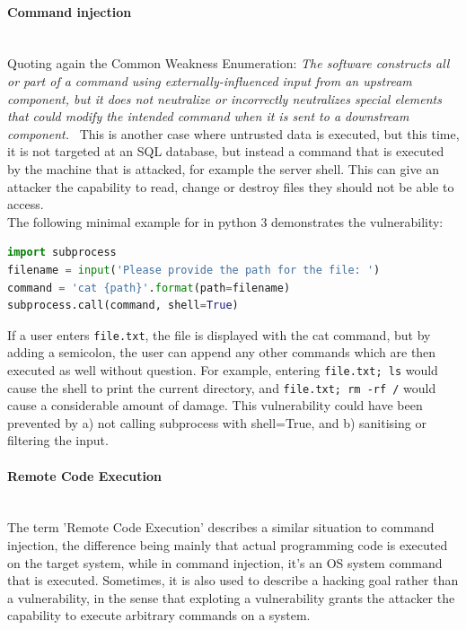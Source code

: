 \documentclass[
	a4paper,
	pagesize,
	pdftex,
	12pt,
	twoside, %
	BCOR=5mm, %
	ngerman,
	fleqn,
	final,
	]{scrartcl}
\begin{document}
\paragraph{Command injection}\mbox{}\\
Quoting again the Common Weakness Enumeration: \textit{The software constructs all or part of a command using externally-influenced input from an upstream component, but it does not neutralize or incorrectly neutralizes special elements that could modify the intended command when it is sent to a downstream component.}~\cite{CommonWeaknessEnumeration.23.9.2019} This is another case where untrusted data is executed, but this time, it is not targeted at an SQL database, but instead a command that is executed by the machine that is attacked, for example the server shell. This can give an attacker the capability to read, change or destroy files they should not be able to access. \\
The following minimal example for in python 3 demonstrates the vulnerability:
\begin{lstlisting}[language=Python,showstringspaces=false]
import subprocess
filename = input('Please provide the path for the file: ')
command = 'cat {path}'.format(path=filename)
subprocess.call(command, shell=True)
\end{lstlisting}
If a user enters \texttt{file.txt}, the file is displayed with the cat command, but by adding a semicolon, the user can append any other commands which are then executed as well without question. For example, entering \texttt{file.txt; ls} would cause the shell to print the current directory, and \texttt{file.txt; rm -rf /} would cause a considerable amount of damage. This vulnerability could have been prevented by a) not calling subprocess with shell=True, and b) sanitising or filtering the input. 


\paragraph{Remote Code Execution}\mbox{}\\
The term 'Remote Code Execution' describes a similar situation to command injection, the difference being mainly that actual programming code is executed on the target system, while in command injection, it's an OS system command that is executed. Sometimes, it is also used to describe a hacking goal rather than a vulnerability, in the sense that exploting a vulnerability grants the attacker the capability to execute arbitrary commands on a system. 
\end{document}
